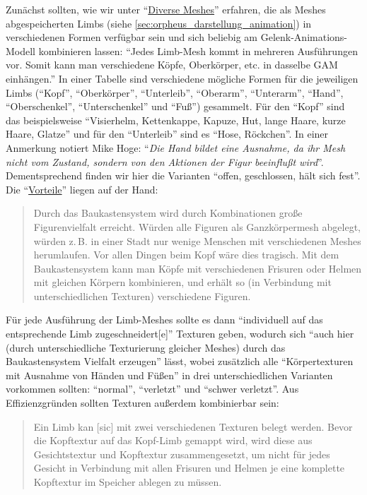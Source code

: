 \documentclass[a5paper,pagesize]{scrbook}
\begin{document}
Zunächst sollten, wie wir unter \enquote{\uline{Diverse Meshes}} erfahren, die als Meshes abgespeicherten Limbs (siehe \autoref{sec:orpheus_darstellung_animation}) in verschiedenen Formen verfügbar sein und sich beliebig am Gelenk-Animations-Modell kombinieren lassen:
\enquote{Jedes Limb-Mesh kommt in mehreren Ausführungen vor.
Somit kann man verschiedene Köpfe, Oberkörper, etc. in dasselbe GAM einhängen.}
In einer Tabelle sind verschiedene mögliche Formen für die jeweiligen Limbs (\enquote{Kopf}, \enquote{Oberkörper}, \enquote{Unterleib}, \enquote{Oberarm}, \enquote{Unterarm}, \enquote{Hand}, \enquote{Oberschenkel}, \enquote{Unterschenkel} und \enquote{Fuß}) gesammelt.
Für den \enquote{Kopf} sind das beispielsweise \enquote{Visierhelm, Kettenkappe, Kapuze, Hut, lange Haare, kurze Haare, Glatze} und für den \enquote{Unterleib} sind es \enquote{Hose, Röckchen}.
In einer Anmerkung notiert Mike Hoge: \enquote{\textit{Die Hand bildet eine Ausnahme, da ihr Mesh nicht vom Zustand, sondern von den Aktionen der Figur beeinflußt wird}}.
Dementsprechend finden wir hier die Varianten \enquote{offen, geschlossen, hält sich fest}.
Die \enquote{\uline{Vorteile}} liegen auf der Hand:

\begin{quote}
   Durch das Baukastensystem wird durch Kombinationen große Figurenvielfalt erreicht.
   Würden alle Figuren als Ganzkörpermesh abgelegt, würden z.\,B. in einer Stadt nur wenige Menschen mit verschiedenen Meshes herumlaufen.
   Vor allen Dingen beim Kopf wäre dies tragisch.
   Mit dem Baukastensystem kann man Köpfe mit verschiedenen Frisuren oder Helmen mit gleichen Körpern kombinieren, und erhält so (in Verbindung mit unterschiedlichen Texturen) verschiedene Figuren.
\end{quote}

Für jede Ausführung der Limb-Meshes sollte es dann \enquote{individuell auf das entsprechende Limb zugeschneidert[e]} Texturen geben, wodurch sich \enquote{auch hier (durch unterschiedliche Texturierung gleicher Meshes) durch das Baukastensystem Vielfalt erzeugen} lässt, wobei zusätzlich alle \enquote{Körpertexturen mit Ausnahme von Händen und Füßen} in drei unterschiedlichen Varianten vorkommen sollten: \enquote{normal}, \enquote{verletzt} und \enquote{schwer verletzt}.
Aus Effizienzgründen sollten Texturen außerdem kombinierbar sein:

\begin{quote}
   Ein Limb kan [sic] mit zwei verschiedenen Texturen belegt werden.
   Bevor die Kopftextur auf das Kopf-Limb gemappt wird, wird diese aus Gesichtstextur und Kopftextur zusammengesetzt, um nicht für jedes Gesicht in Verbindung mit allen Frisuren und Helmen je eine komplette Kopftextur im Speicher ablegen zu müssen.
\end{quote}
\end{document}
